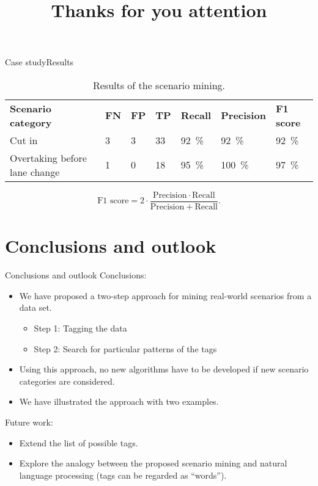 \documentclass[aspectratio=\AspectR,10pt,corporate]{beamer} %
\newcommand{\fonescore}{\mathrm{F1\,\, score}}
\newcommand{\precision}{\mathrm{Precision}}
\newcommand{\recall}{\mathrm{Recall}}
\begin{document}
\begin{frame}{Case study}{Results}
	\begin{table}
		\centering
		\caption{Results of the scenario mining.}
		\begin{tabular}{lllllll}
			\textbf{Scenario category} & \textbf{FN} & \textbf{FP} & \textbf{TP} & \textbf{Recall} & \textbf{Precision} & \textbf{F1 score} \\ 
			Cut in & 3 & 3 & 33 & \SI{92}{\percent} & \SI{92}{\percent} & \SI{92}{\percent}  \\
			Overtaking before lane change & 1 & 0 & 18 & \SI{95}{\percent} & \SI{100}{\percent} & \SI{97}{\percent}
		\end{tabular}
	\end{table}
	\begin{equation*}
		\fonescore = 2 \cdot \frac{\precision\cdot\recall}{\precision+\recall}.
	\end{equation*}
\end{frame}





\section{Conclusions and outlook}
\begin{frame}{Conclusions and outlook}
	Conclusions:
	\begin{itemize}
		\item We have proposed a two-step approach for mining real-world scenarios from a data set.
		\begin{itemize}
			\item Step 1: Tagging the data
			\item Step 2: Search for particular patterns of the tags
		\end{itemize}
		\item Using this approach, no new algorithms have to be developed if new scenario categories are considered.
		\item We have illustrated the approach with two examples.
	\end{itemize}
	
	\pause
	Future work:
	\begin{itemize}
		\item Extend the list of possible tags.
		\item Explore the analogy between the proposed scenario mining and natural language processing (tags can be regarded as ``words'').
	\end{itemize}
\end{frame}

{ %
\titlepagebck
{}  %
\blacktitle                     %
\title{Thanks for you attention}
\begin{frame}
	\titlepage
\end{frame}}
\end{document}
